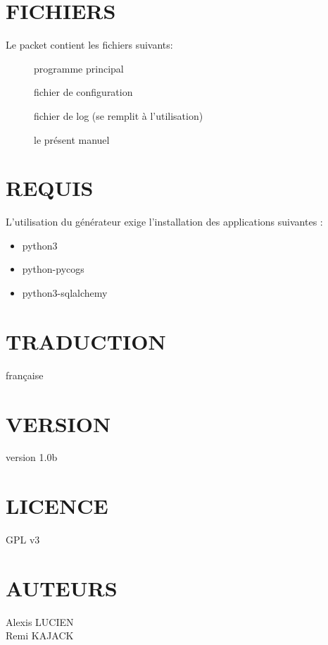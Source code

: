 \documentclass[french]{article}
\begin{document}
\section{FICHIERS}
Le packet contient les fichiers suivants:
\begin{description}
\item[] programme principal
\item[] fichier de configuration
\item[] fichier de log (se remplit à l'utilisation)
\item[] le présent manuel
\end{description}

\section{REQUIS}
L'utilisation du générateur exige l'installation des applications suivantes :
\begin{itemize}
\item python3
\item python-pycogs
\item python3-sqlalchemy
\end{itemize}

\section{TRADUCTION}
française

\section{VERSION}
version 1.0b

\section{LICENCE}
GPL v3

\section{AUTEURS}
Alexis LUCIEN\\
Remi KAJACK
\end{document}
